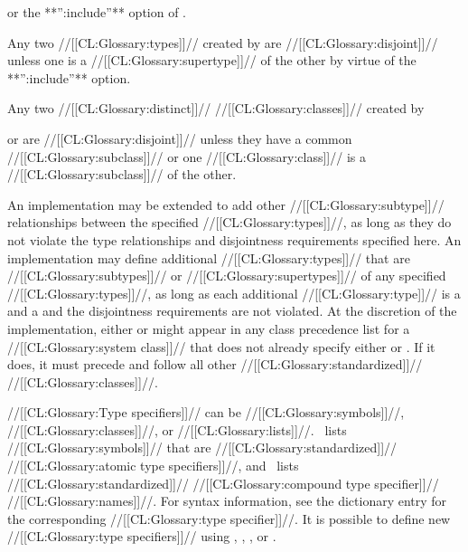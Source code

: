 or the **'':include''** option of .


\itemitem{\bull} Any two //[[CL:Glossary:types]]// created by  are  //[[CL:Glossary:disjoint]]// unless one is a //[[CL:Glossary:supertype]]// of the other by virtue of the  **'':include''** option.


\itemitem{\bull} Any two //[[CL:Glossary:distinct]]// //[[CL:Glossary:classes]]// created by  

or  are //[[CL:Glossary:disjoint]]// unless they have a common //[[CL:Glossary:subclass]]// or one //[[CL:Glossary:class]]// is a //[[CL:Glossary:subclass]]// of the other.


\itemitem{\bull}  An implementation may be extended to add other //[[CL:Glossary:subtype]]// relationships between the specified //[[CL:Glossary:types]]//, as long as they do not violate the type relationships and disjointness requirements specified here.  An implementation may define additional //[[CL:Glossary:types]]// that are //[[CL:Glossary:subtypes]]// or //[[CL:Glossary:supertypes]]// of any specified //[[CL:Glossary:types]]//, as long as each additional //[[CL:Glossary:type]]// is a  and a  and the disjointness requirements are not violated.
   At the discretion of the implementation, either  or  might appear in any class precedence list for a //[[CL:Glossary:system class]]// that does not already specify either   or .  If it does, it must precede  and follow all other //[[CL:Glossary:standardized]]// //[[CL:Glossary:classes]]//.

\endlist                                     

\endsubSection%

 


//[[CL:Glossary:Type specifiers]]// can be //[[CL:Glossary:symbols]]//, //[[CL:Glossary:classes]]//, or //[[CL:Glossary:lists]]//. \figref\StandardizedAtomicTypeSpecs\ lists //[[CL:Glossary:symbols]]// that are
  //[[CL:Glossary:standardized]]// //[[CL:Glossary:atomic type specifiers]]//, and \figref\StandardizedCompoundTypeSpecNames\ lists
 //[[CL:Glossary:standardized]]// //[[CL:Glossary:compound type specifier]]// //[[CL:Glossary:names]]//. For syntax information, see the dictionary entry for the corresponding //[[CL:Glossary:type specifier]]//. It is possible to define new //[[CL:Glossary:type specifiers]]// using
 ,
 ,
 ,  or
 .

